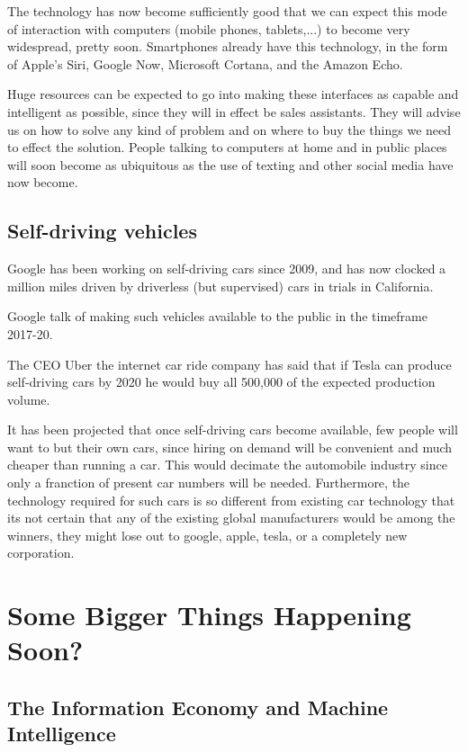 \documentclass[12pt,titlepage]{article}
\begin{document}
{The technology has now become sufficiently good that
we can expect this mode of interaction with computers
(mobile phones, tablets,...) to become very widespread,
pretty soon.
Smartphones already have this technology, in the form
of Apple's Siri, Google Now, Microsoft Cortana, and
the Amazon Echo.

Huge resources can be expected to go into making these
interfaces as capable and intelligent as possible,
since they will in effect be sales assistants.
They will advise us on how to solve any kind of problem
and on where to buy the things we need to effect the solution.
People talking to computers at home and in public places
will soon become as ubiquitous as the use of texting and
other social media have now become.

\subsection{Self-driving vehicles}

Google has been working on self-driving cars since 2009,
and has now clocked a million miles driven by driverless
(but supervised) cars in trials in California.

Google talk of making such vehicles available to the public in the
timeframe 2017-20.

The CEO Uber the internet car ride company has said that
if Tesla can produce self-driving cars by 2020 he would buy
all 500,000 of the expected production volume.

It has been projected that once self-driving cars become
available, few people will want to but their own cars, since
hiring on demand will be convenient and much cheaper than
running a car.
This would decimate the automobile industry since only a franction
of present car numbers will be needed.
Furthermore, the technology required for such cars is so different
from existing car technology that its not certain that any of the
existing global manufacturers would be among the winners, they
might lose out to google, apple, tesla, or a completely new corporation.

\section{Some Bigger Things Happening Soon?}

\subsection{The Information Economy and Machine Intelligence}

}
\end{document}
